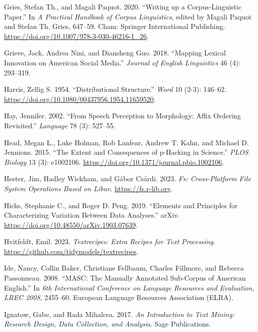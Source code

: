 \documentclass[
  letterpaper,
]{latex/krantz}
\newlength{\cslhangindent}
\newenvironment{CSLReferences}[2] %
 {\begin{list}{}{%
  \setlength{\itemindent}{0pt}
  \setlength{\leftmargin}{0pt}
  \setlength{\parsep}{0pt}
  \ifodd #1
   \setlength{\leftmargin}{\cslhangindent}
   \setlength{\itemindent}{-1\cslhangindent}
  \fi
  \setlength{\itemsep}{#2\baselineskip}}}
 {\end{list}}
\theoremstyle{definition}
\theoremstyle{remark}
\begin{document}
\begin{CSLReferences}{1}{0}
Gries, Stefan Th., and Magali Paquot. 2020. {``Writing up a
Corpus-Linguistic Paper.''} In \emph{A Practical Handbook of Corpus
Linguistics}, edited by Magali Paquot and Stefan Th. Gries, 647--59.
Cham: Springer International Publishing.
\url{https://doi.org/10.1007/978-3-030-46216-1_26}.

Grieve, Jack, Andrea Nini, and Diansheng Guo. 2018. {``Mapping Lexical
Innovation on American Social Media.''} \emph{Journal of English
Linguistics} 46 (4): 293--319.

Harris, Zellig S. 1954. {``Distributional Structure.''} \emph{Word} 10
(2-3): 146--62. \url{https://doi.org/10.1080/00437956.1954.11659520}.

Hay, Jennifer. 2002. {``From Speech Perception to Morphology: Affix
Ordering Revisited.''} \emph{Language} 78 (3): 527--55.

Head, Megan L., Luke Holman, Rob Lanfear, Andrew T. Kahn, and Michael D.
Jennions. 2015. {``The Extent and Consequences of p-Hacking in
Science.''} \emph{PLOS Biology} 13 (3): e1002106.
\url{https://doi.org/10.1371/journal.pbio.1002106}.

Hester, Jim, Hadley Wickham, and Gábor Csárdi. 2023. \emph{Fs:
Cross-Platform File System Operations Based on Libuv}.
\url{https://fs.r-lib.org}.

Hicks, Stephanie C., and Roger D. Peng. 2019. {``Elements and Principles
for Characterizing Variation Between Data Analyses.''} arXiv.
\url{https://doi.org/10.48550/arXiv.1903.07639}.

Hvitfeldt, Emil. 2023. \emph{Textrecipes: Extra Recipes for Text
Processing}. \url{https://github.com/tidymodels/textrecipes}.

Ide, Nancy, Collin Baker, Christiane Fellbaum, Charles Fillmore, and
Rebecca Passonneau. 2008. {``MASC: The Manually Annotated Sub-Corpus of
American English.''} In \emph{6th International Conference on Language
Resources and Evaluation, LREC 2008}, 2455--60. European Language
Resources Association (ELRA).

Ignatow, Gabe, and Rada Mihalcea. 2017. \emph{An Introduction to Text
Mining: Research Design, Data Collection, and Analysis}. Sage
Publications.


\end{CSLReferences}
\end{document}
